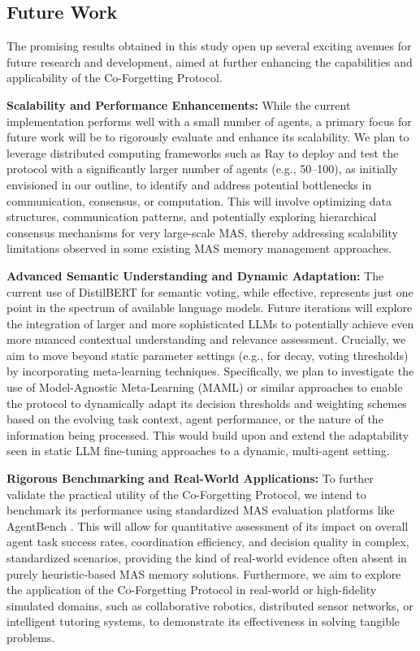 \documentclass[conference]{IEEEtran}
\begin{document}
\subsection{Future Work}
\label{sec:future_work}

The promising results obtained in this study open up several exciting avenues for future research and development, aimed at further enhancing the capabilities and applicability of the Co-Forgetting Protocol.

\textbf{Scalability and Performance Enhancements:} While the current implementation performs well with a small number of agents, a primary focus for future work will be to rigorously evaluate and enhance its scalability. We plan to leverage distributed computing frameworks such as Ray to deploy and test the protocol with a significantly larger number of agents (e.g., 50–100), as initially envisioned in our outline, to identify and address potential bottlenecks in communication, consensus, or computation. This will involve optimizing data structures, communication patterns, and potentially exploring hierarchical consensus mechanisms for very large-scale MAS, thereby addressing scalability limitations observed in some existing MAS memory management approaches.

\textbf{Advanced Semantic Understanding and Dynamic Adaptation:} The current use of DistilBERT for semantic voting, while effective, represents just one point in the spectrum of available language models. Future iterations will explore the integration of larger and more sophisticated LLMs to potentially achieve even more nuanced contextual understanding and relevance assessment. Crucially, we aim to move beyond static parameter settings (e.g., for decay, voting thresholds) by incorporating meta-learning techniques. Specifically, we plan to investigate the use of Model-Agnostic Meta-Learning (MAML) \cite{Finn2017} or similar approaches to enable the protocol to dynamically adapt its decision thresholds and weighting schemes based on the evolving task context, agent performance, or the nature of the information being processed. This would build upon and extend the adaptability seen in static LLM fine-tuning approaches to a dynamic, multi-agent setting.

\textbf{Rigorous Benchmarking and Real-World Applications:} To further validate the practical utility of the Co-Forgetting Protocol, we intend to benchmark its performance using standardized MAS evaluation platforms like AgentBench \cite{Liu2023agentbench}. This will allow for quantitative assessment of its impact on overall agent task success rates, coordination efficiency, and decision quality in complex, standardized scenarios, providing the kind of real-world evidence often absent in purely heuristic-based MAS memory solutions. Furthermore, we aim to explore the application of the Co-Forgetting Protocol in real-world or high-fidelity simulated domains, such as collaborative robotics, distributed sensor networks, or intelligent tutoring systems, to demonstrate its effectiveness in solving tangible problems.
\end{document}
